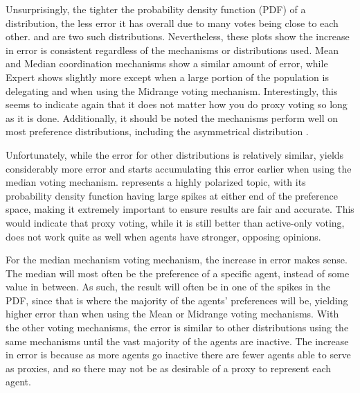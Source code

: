 Unsurprisingly, the tighter the probability density function (PDF) of a distribution,
the less error it has overall due to many votes being close to each other.
 and \gaussian are two such distributions.
Nevertheless, these plots show the increase in error is consistent regardless of the
mechanisms or distributions used.
Mean and Median coordination mechanisms show a similar amount of error, while Expert
shows slightly more except when a large portion of the population is delegating and
when using the Midrange voting mechanism.
Interestingly, this seems to indicate again that it does not matter how you do proxy
voting so long as it is done.
Additionally, it should be noted the mechanisms perform well on most preference
distributions, including the asymmetrical distribution .

Unfortunately, while the error for other distributions is relatively similar,
 yields considerably more error and starts accumulating
this error earlier when using the median voting mechanism.
 represents a highly polarized topic, with its probability
density function having large spikes at either end of the preference space, making it
extremely important to ensure results are fair and accurate.
This would indicate that proxy voting, while it is still better than active-only
voting, does not work quite as well when agents have stronger, opposing opinions.

For the median mechanism voting mechanism, the increase in error makes sense.
The median will most often be the preference of a specific agent, instead of some
value in between.
As such, the result will often be in one of the spikes in the PDF, since that is
where the majority of the agents' preferences will be, yielding higher error than when
using the Mean or Midrange voting mechanisms.
With the other voting mechanisms, the error is similar to other distributions using
the same mechanisms until the vast majority of the agents are inactive.
The increase in error is because as more agents go inactive there are fewer agents able
to serve as proxies, and so there may not be as desirable of a proxy to represent
each agent.

